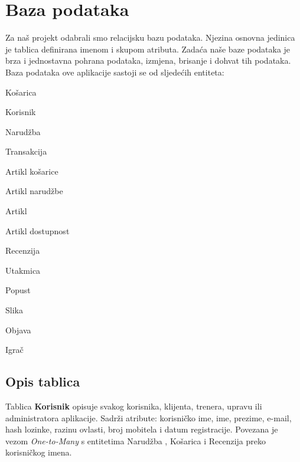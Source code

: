 	
		

		

				
		\section{Baza podataka}
			
			
		\textnormal{Za naš projekt odabrali smo relacijsku bazu podataka. Njezina osnovna jedinica je tablica definirana imenom i skupom atributa. Zadaća naše baze podataka je brza i jednostavna pohrana podataka, izmjena, brisanje i dohvat tih podataka. Baza podataka ove aplikacije sastoji se od sljedećih entiteta:}
		\smallbreak
			\begin{packed_item}
				\setlength\itemsep{0.01em}
			\item  Košarica
			\item  Korisnik
			\item  Narudžba
			\item Transakcija
			\item Artikl košarice
			\item Artikl narudžbe
			\item Artikl
			\item Artikl dostupnost
			\item Recenzija
			\item Utakmica
			\item Popust
			\item Slika
			\item Objava
			\item Igrač
		\end{packed_item}
		
		
			\subsection{Opis tablica}
			

				\textnormal{Tablica \textbf{Korisnik} opisuje svakog korisnika, klijenta, trenera, upravu ili administratora aplikacije. Sadrži atribute: korisničko ime, ime, prezime, e-mail, hash lozinke, razinu ovlasti, broj mobitela i datum registracije. Povezana je vezom \textit{One-to-Many}  s entitetima Narudžba , Košarica i Recenzija preko korisničkog imena. }
				
